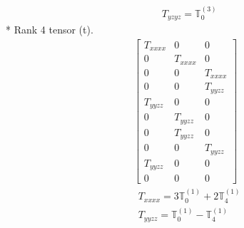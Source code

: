 \documentclass[fleqn,8pt,landscape]{jsarticle}
\begin{document}
\begin{align*}
& T_{yzyz} = \mathbb{T}_{0}^{(3)}
\end{align*}
* Rank 4 tensor (t).
\begin{align*}
\begin{bmatrix} T_{xxxx} & 0 & 0 \\ 0 & T_{xxxx} & 0 \\ 0 & 0 & T_{xxxx} \\ 0 & 0 & T_{yyzz} \\ T_{yyzz} & 0 & 0 \\ 0 & T_{yyzz} & 0 \\ 0 & T_{yyzz} & 0 \\ 0 & 0 & T_{yyzz} \\ T_{yyzz} & 0 & 0 \\ 0 & 0 & 0 \end{bmatrix}
\end{align*}
\begin{align*}
& T_{xxxx} = 3 \mathbb{T}_{0}^{(1)} + 2 \mathbb{T}_{4}^{(1)} \\
& T_{yyzz} = \mathbb{T}_{0}^{(1)} - \mathbb{T}_{4}^{(1)}
\end{align*}
\end{document}
